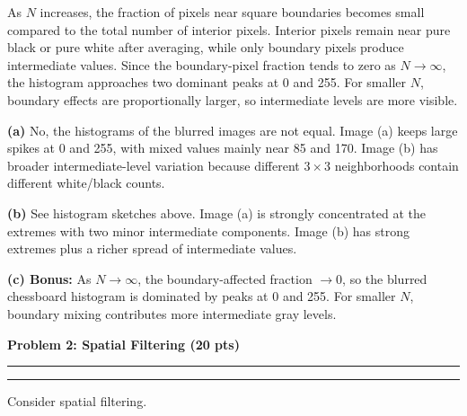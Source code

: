\documentclass[12pt]{article}
\newcommand{\question}[1]{%
  \clearpage
  \vspace{0.5cm}
  {\noindent\normalsize \textbf{#1}}
  \vspace{0.2cm}
  \hrule
  \vspace{0.1cm}
  \hrule
  \vspace{0.3cm}
}
\begin{document}
\begin{stepbox}
As $N$ increases, the fraction of pixels near square boundaries becomes small compared to the total number of interior pixels. Interior pixels remain near pure black or pure white after averaging, while only boundary pixels produce intermediate values. Since the boundary-pixel fraction tends to zero as $N\to\infty$, the histogram approaches two dominant peaks at 0 and 255. For smaller $N$, boundary effects are proportionally larger, so intermediate levels are more visible.
\end{stepbox}

\begin{resultsbox}
\textbf{(a)} No, the histograms of the blurred images are not equal. Image (a) keeps large spikes at 0 and 255, with mixed values mainly near 85 and 170. Image (b) has broader intermediate-level variation because different $3\times3$ neighborhoods contain different white/black counts.

\textbf{(b)} See histogram sketches above. Image (a) is strongly concentrated at the extremes with two minor intermediate components. Image (b) has strong extremes plus a richer spread of intermediate values.

\textbf{(c) Bonus:} As $N \to \infty$, the boundary-affected fraction $\to 0$, so the blurred chessboard histogram is dominated by peaks at 0 and 255. For smaller $N$, boundary mixing contributes more intermediate gray levels.
\end{resultsbox}



\question{Problem 2: Spatial Filtering (20 pts)}\label{quest:2}

Consider spatial filtering.
\end{document}
